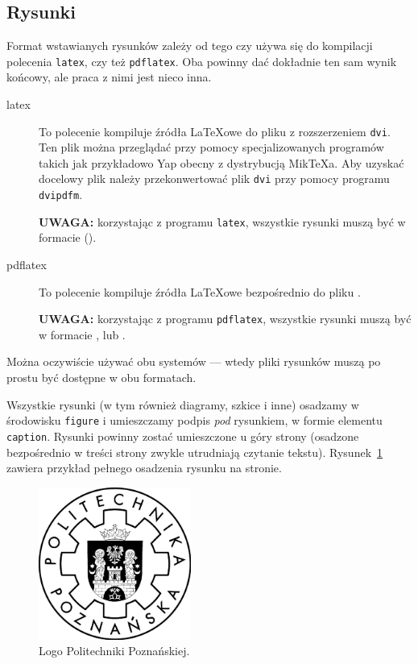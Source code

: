\subsection{Rysunki}

Format wstawianych rysunków zależy od tego czy używa się do kompilacji polecenia
\texttt{latex}, czy też \texttt{pdflatex}. Oba powinny dać dokładnie ten sam wynik końcowy,
ale praca z nimi jest nieco inna.

\begin{description}
    \item[latex] To polecenie kompiluje źródła \LaTeX{}owe do pliku 
        z rozszerzeniem \texttt{dvi}. Ten plik można przeglądać przy pomocy specjalizowanych programów
        takich jak przykładowo Yap obecny z dystrybucją Mik\TeX{}a. Aby uzyskać docelowy plik 
        należy przekonwertować plik \texttt{dvi} przy pomocy programu \texttt{dvipdfm}. 
        
        \textbf{UWAGA:} korzystając z programu \texttt{latex}, wszystkie rysunki muszą być w formacie 
        ().

    \item[pdflatex] To polecenie kompiluje źródła \LaTeX{}owe bezpośrednio do pliku .
    
        \textbf{UWAGA:} korzystając z programu \texttt{pdflatex}, wszystkie rysunki muszą być w formacie ,
         lub .
\end{description}

Można oczywiście używać obu systemów --- wtedy pliki rysunków muszą po prostu być dostępne w obu formatach.

Wszystkie rysunki (w tym również diagramy, szkice i inne) osadzamy w środowisku 
\texttt{figure} i umieszczamy podpis \emph{pod} rysunkiem, w formie elementu \texttt{caption}. Rysunki powinny
zostać umieszczone u góry strony (osadzone bezpośrednio w treści strony zwykle utrudniają czytanie tekstu).
Rysunek~\ref{rys:plama} zawiera przykład pełnego osadzenia rysunku na stronie.

\begin{figure}[t] %
\centering\includegraphics[width=5cm]{figures/template/logo-pp}
\caption{Logo Politechniki Poznańskiej.}\label{rys:plama}
\end{figure}

